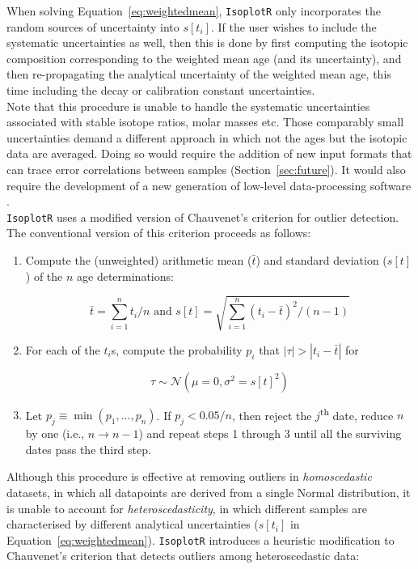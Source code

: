 \documentclass{article}
\begin{document}
When solving Equation~\ref{eq:weightedmean}, \texttt{IsoplotR} only
incorporates the random sources of uncertainty into $s[t_i]$.  If the
user wishes to include the systematic uncertainties as well, then this
is done by first computing the isotopic composition corresponding to
the weighted mean age (and its uncertainty), and then re-propagating
the analytical uncertainty of the weighted mean age, this time
including the decay or calibration constant uncertainties.\\

Note that this procedure is unable to handle the systematic
uncertainties associated with stable isotope ratios, molar masses
etc. Those comparably small uncertainties demand a different approach
in which not the ages but the isotopic data are averaged.  Doing so
would require the addition of new input formats that can trace error
correlations between samples (Section~\ref{sec:future}). It would also
require the development of a new generation of low-level
data-processing software \citep{vermeesch2015b,mclean2016}.\\

\texttt{IsoplotR} uses a modified version of Chauvenet's criterion for
outlier detection. The conventional version of this criterion proceeds
as follows:

\begin{enumerate}
\item Compute the (unweighted) arithmetic mean ($\bar{t}$) and
  standard deviation ($s[t]$) of the $n$ age determinations:

  \[
  \bar{t} = \sum_{i=1}^{n} t_i/n \mbox{~and~}
  s[t] = \sqrt{\sum_{i=1}^{n} (t_i-\bar{t})^2/(n-1)}
  \]

\item For each of the $t_i$s, compute the probability $p_i$ that
  $|\tau|>|t_i-\bar{t}|$ for

  \[
  \tau \sim \mathcal{N}(\mu=0,\sigma^2=s[t]^2)
  \]
  
\item Let $p_j \equiv \min(p_1,...,p_n)$. If $p_j<0.05/n$, then reject
  the $j$\textsuperscript{th} date, reduce $n$ by one (i.e., $n
  \rightarrow n-1$) and repeat steps 1 through 3 until all the
  surviving dates pass the third step.

\end{enumerate}

Although this procedure is effective at removing outliers in
\emph{homoscedastic} datasets, in which all datapoints are derived
from a single Normal distribution, it is unable to account for
\emph{heteroscedasticity}, in which different samples are
characterised by different analytical uncertainties ($s[t_i]$ in
Equation~\ref{eq:weightedmean}). \texttt{IsoplotR} introduces a
heuristic modification to Chauvenet's criterion that detects outliers
among heteroscedastic data:
\end{document}
